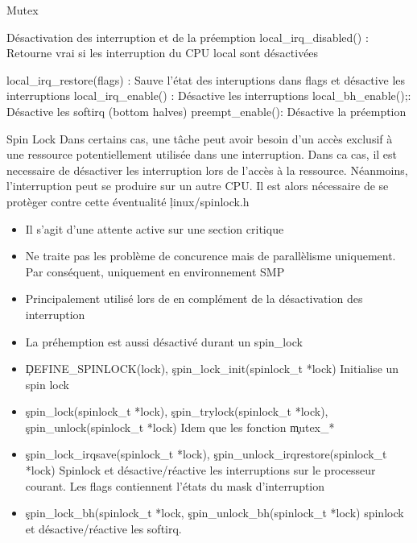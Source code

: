 \begin{frame}{Mutex}
\begin{frame}{Désactivation des interruption et de la préemption}
local_irq_disabled() : Retourne vrai si les interruption du CPU local sont désactivées

local_irq_restore(flags) : Sauve l'état des interuptions dans flags et désactive les interruptions 
local_irq_enable() : Désactive les interruptions
local_bh_enable();: Désactive les softirq (bottom halves)
preempt_enable(): Désactive la préemption
\end{frame} 

\begin{frame}{Spin Lock}
Dans certains cas,  une tâche peut avoir besoin
  d'un accès  exclusif à  une ressource potentiellement  utilisée dans
  une interruption. Dans  ca cas, il est necessaire  de désactiver les
  interruption   lors   de   l'accès   à  la   ressource.   Néanmoins,
  l'interruption  peut se  produire sur  un  autre CPU.  Il est  alors
  nécessaire de se protèger contre cette éventualité
  \c{linux/spinlock.h} 
\begin{itemize} 
\item Il s'agit d'une attente active sur une section critique
\item Ne traite pas les problème de concurence mais de parallèlisme uniquement. Par conséquent, uniquement en environnement SMP
\item Principalement utilisé lors de en complément de la désactivation des interruption
\item La préhemption est aussi désactivé durant un spin_lock
\end{itemize} 
\begin{itemize}
\item \c{DEFINE_SPINLOCK(lock)},  \c{spin_lock_init(spinlock_t *lock)} Initialise un spin lock
\item \c{spin_lock(spinlock_t *lock)}, \c{spin_trylock(spinlock_t *lock)}, \c{spin_unlock(spinlock_t *lock)} Idem que les fonction \c{mutex_*}
\item \c{spin_lock_irqsave(spinlock_t *lock)}, \c{spin_unlock_irqrestore(spinlock_t *lock)} Spinlock et désactive/réactive les interruptions sur le processeur courant. Les flags contiennent l'états du mask d'interruption
\item \c{spin_lock_bh(spinlock_t *lock}, \c{spin_unlock_bh(spinlock_t *lock)} spinlock et désactive/réactive les softirq.
\end{itemize} 
\end{frame} 


\end{frame}
